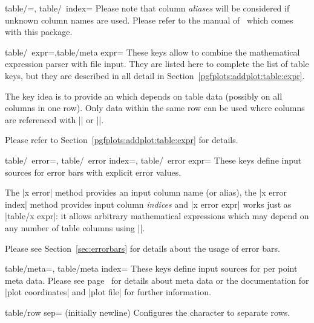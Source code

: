 {\begin{pgfplotsxykeylist}{table/\x=,
	table/\x\ index=}
	Please note that column \emph{aliases} will be considered if unknown column names are used. Please refer to the manual of \PGFPlotstable\ which comes with this package.
\end{pgfplotsxykeylist}

\begin{pgfplotsxykeylist}{table/\x\ expr=,table/meta expr=}
	These keys allow to combine the mathematical expression parser with file input. They are listed here to complete the list of table keys, but they are described in all detail in Section~\ref{pgfplots:addplot:table:expr}.

	The key idea is to provide an  which depends on table data (possibly on all columns in one row). Only data within the same row can be used where columns are referenced with |\thisrow| or |\thisrowno|. 
	
	Please refer to Section~\ref{pgfplots:addplot:table:expr} for details.
\end{pgfplotsxykeylist}


\begin{pgfplotsxykeylist}{%
	table/\x\ error=,
	table/\x\ error index=,
	table/\x\ error expr=}
	These keys define input sources for error bars with explicit error values. 
	
	The |x error| method provides an input column name (or alias), the |x error index| method provides input column \emph{indices} and |x error expr| works just as |table/x expr|: it allows arbitrary mathematical expressions which may depend on any number of table columns using |\thisrow|.

	Please see Section~\ref{sec:errorbars} for details about the usage of error bars.
\end{pgfplotsxykeylist}
\begin{pgfplotsxykeylist}{%
	table/meta=,
	table/meta index=}
	These keys define input sources for per point meta data. Please see page~\pageref{pgfplots:scatter:src} for details about meta data or the documentation for |plot coordinates| and |plot file| for further information.
\end{pgfplotsxykeylist}


\begin{pgfplotskey}{table/row sep= (initially newline)}
	Configures the character to separate rows.


\end{pgfplotskey}}
